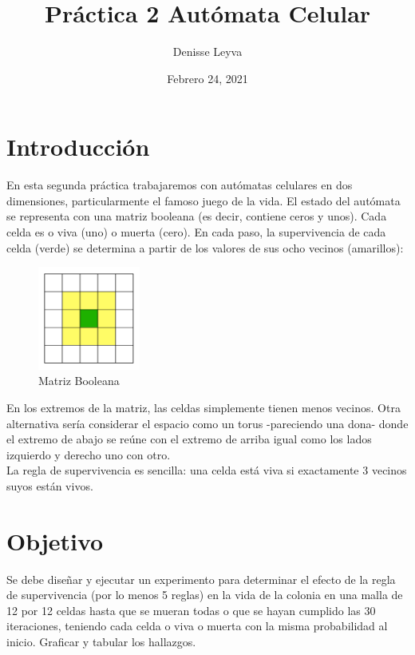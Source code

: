 \documentclass{article}
\title{Práctica 2 Autómata Celular}
\author{Denisse Leyva}
\date{Febrero 24, 2021}
\begin{document}
\maketitle

\section{Introducción}
En esta segunda práctica trabajaremos con autómatas celulares en dos dimensiones, particularmente el famoso juego de la vida. El estado del autómata se representa con una matriz booleana (es decir, contiene ceros y unos). Cada celda es o viva (uno) o muerta (cero). En cada paso, la supervivencia de cada celda (verde) se determina a partir de los valores de sus ocho vecinos (amarillos):\\

\begin{multicols}{2}
\begin{figure}[H]
\centering
\includegraphics [width =0.3\textwidth]{p2v.png}
\caption{Matriz Booleana}
\end{figure}
\end{multicols}


En los extremos de la matriz, las celdas simplemente tienen menos vecinos. Otra alternativa sería considerar el espacio como un torus -pareciendo una dona- donde el extremo de abajo se reúne con el extremo de arriba igual como los lados izquierdo y derecho uno con otro.\\
La regla de supervivencia es sencilla: una celda está viva si exactamente 3 vecinos suyos están vivos\cite{Satu_Elisa_Schaeffer}.


\section{Objetivo}
Se debe diseñar y ejecutar un experimento para determinar el efecto de la regla de supervivencia (por lo menos 5 reglas) en la vida de la colonia en una malla de 12 por 12 celdas hasta que se mueran todas o que se hayan cumplido las 30 iteraciones, teniendo cada celda o viva o muerta con la misma probabilidad al inicio. Graficar y tabular los hallazgos\cite{Satu_Elisa_Schaeffer}.
\end{document}
